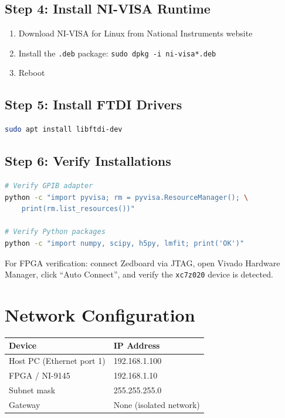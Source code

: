 \documentclass[11pt,a4paper,openany]{book}
\begin{document}
\subsection{Step 4: Install NI-VISA Runtime}

\begin{enumerate}[nosep]
  \item Download NI-VISA for Linux from National Instruments website
  \item Install the \texttt{.deb} package: \texttt{sudo dpkg -i ni-visa*.deb}
  \item Reboot
\end{enumerate}

\subsection{Step 5: Install FTDI Drivers}

\begin{lstlisting}[language=bash,numbers=none]
sudo apt install libftdi-dev
\end{lstlisting}

\subsection{Step 6: Verify Installations}

\begin{lstlisting}[language=bash,numbers=none]
# Verify GPIB adapter
python -c "import pyvisa; rm = pyvisa.ResourceManager(); \
    print(rm.list_resources())"

# Verify Python packages
python -c "import numpy, scipy, h5py, lmfit; print('OK')"
\end{lstlisting}

\noindent
For FPGA verification: connect Zedboard via JTAG, open Vivado Hardware Manager, click ``Auto Connect'', and verify the \texttt{xc7z020} device is detected.

\section{Network Configuration}

\begin{center}
\begin{tabular}{ll}
\toprule
\textbf{Device} & \textbf{IP Address} \\
\midrule
Host PC (Ethernet port 1) & 192.168.1.100 \\
FPGA / NI-9145 & 192.168.1.10 \\
Subnet mask & 255.255.255.0 \\
Gateway & None (isolated network) \\
\bottomrule
\end{tabular}
\end{center}
\end{document}
